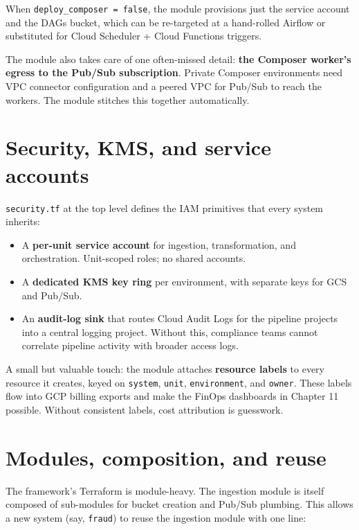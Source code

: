 \documentclass[
  11pt,
  british,
  oneside]{book}
\providecommand{\tightlist}{%
  \setlength{\itemsep}{0pt}\setlength{\parskip}{0pt}}
\begin{document}
When \texttt{deploy\_composer\ =\ false}, the module provisions just the
service account and the DAGs bucket, which can be re-targeted at a
hand-rolled Airflow or substituted for Cloud Scheduler + Cloud Functions
triggers.

The module also takes care of one often-missed detail: \textbf{the
Composer worker's egress to the Pub/Sub subscription}. Private Composer
environments need VPC connector configuration and a peered VPC for
Pub/Sub to reach the workers. The module stitches this together
automatically.

\hypertarget{security-kms-and-service-accounts}{%
\section{Security, KMS, and service
accounts}\label{security-kms-and-service-accounts}}

\texttt{security.tf} at the top level defines the IAM primitives that
every system inherits:

\begin{itemize}
\tightlist
\item
  A \textbf{per-unit service account} for ingestion, transformation, and
  orchestration. Unit-scoped roles; no shared accounts.
\item
  A \textbf{dedicated KMS key ring} per environment, with separate keys
  for GCS and Pub/Sub.
\item
  An \textbf{audit-log sink} that routes Cloud Audit Logs for the
  pipeline projects into a central logging project. Without this,
  compliance teams cannot correlate pipeline activity with broader
  access logs.
\end{itemize}

A small but valuable touch: the module attaches \textbf{resource labels}
to every resource it creates, keyed on \texttt{system}, \texttt{unit},
\texttt{environment}, and \texttt{owner}. These labels flow into GCP
billing exports and make the FinOps dashboards in Chapter 11 possible.
Without consistent labels, cost attribution is guesswork.

\hypertarget{modules-composition-and-reuse}{%
\section{Modules, composition, and
reuse}\label{modules-composition-and-reuse}}

The framework's Terraform is module-heavy. The ingestion module is
itself composed of sub-modules for bucket creation and Pub/Sub plumbing.
This allows a new system (say, \texttt{fraud}) to reuse the ingestion
module with one line:
\end{document}
